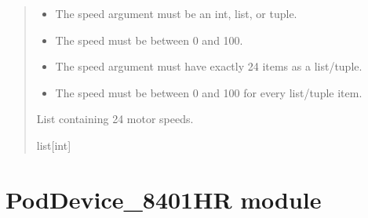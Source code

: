 \documentclass[letterpaper,10pt,english]{sphinxmanual}
\begin{document}
\begin{fulllineitems}
\begin{fulllineitems}
\begin{quote}
\begin{description}
\begin{itemize}
\item {} 
\sphinxAtStartPar
{} \textendash{} The speed argument must be an int, list, or tuple.

\item {} 
\sphinxAtStartPar
{} \textendash{} The speed must be between 0 and 100.

\item {} 
\sphinxAtStartPar
{} \textendash{} The speed argument must have exactly 24 items as a list/tuple.

\item {} 
\sphinxAtStartPar
{} \textendash{} The speed must be between 0 and 100 for every list/tuple item.

\end{itemize}

\sphinxAtStartPar
List containing 24 motor speeds.

\sphinxAtStartPar
list{[}int{]}

\end{description}\end{quote}

\end{fulllineitems}


\end{fulllineitems}


\sphinxstepscope


\section{PodDevice\_8401HR module}
\label{\detokenize{PodDevice_8401HR:module-PodDevice_8401HR}}\label{\detokenize{PodDevice_8401HR:poddevice-8401hr-module}}\label{\detokenize{PodDevice_8401HR::doc}}
\end{document}
